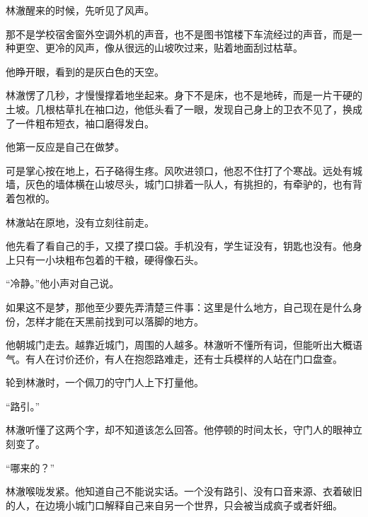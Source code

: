 \begin{aibox}
\hspace*{2em}林澈醒来的时候，先听见了风声。

\hspace*{2em}那不是学校宿舍窗外空调外机的声音，也不是图书馆楼下车流经过的声音，而是一种更空、更冷的风声，像从很远的山坡吹过来，贴着地面刮过枯草。

\hspace*{2em}他睁开眼，看到的是灰白色的天空。

\hspace*{2em}林澈愣了几秒，才慢慢撑着地坐起来。身下不是床，也不是地砖，而是一片干硬的土坡。几根枯草扎在袖口边，他低头看了一眼，发现自己身上的卫衣不见了，换成了一件粗布短衣，袖口磨得发白。

\hspace*{2em}他第一反应是自己在做梦。

\hspace*{2em}可是掌心按在地上，石子硌得生疼。风吹进领口，他忍不住打了个寒战。远处有城墙，灰色的墙体横在山坡尽头，城门口排着一队人，有挑担的，有牵驴的，也有背着包袱的。

\hspace*{2em}林澈站在原地，没有立刻往前走。

\hspace*{2em}他先看了看自己的手，又摸了摸口袋。手机没有，学生证没有，钥匙也没有。他身上只有一小块粗布包着的干粮，硬得像石头。

\hspace*{2em}``冷静。''他小声对自己说。

\hspace*{2em}如果这不是梦，那他至少要先弄清楚三件事：这里是什么地方，自己现在是什么身份，怎样才能在天黑前找到可以落脚的地方。

\hspace*{2em}他朝城门走去。越靠近城门，周围的人越多。林澈听不懂所有词，但能听出大概语气。有人在讨价还价，有人在抱怨路难走，还有士兵模样的人站在门口盘查。

\hspace*{2em}轮到林澈时，一个佩刀的守门人上下打量他。

\hspace*{2em}``路引。''

\hspace*{2em}林澈听懂了这两个字，却不知道该怎么回答。他停顿的时间太长，守门人的眼神立刻变了。

\hspace*{2em}``哪来的？''

\hspace*{2em}林澈喉咙发紧。他知道自己不能说实话。一个没有路引、没有口音来源、衣着破旧的人，在边境小城门口解释自己来自另一个世界，只会被当成疯子或者奸细。


\end{aibox}
